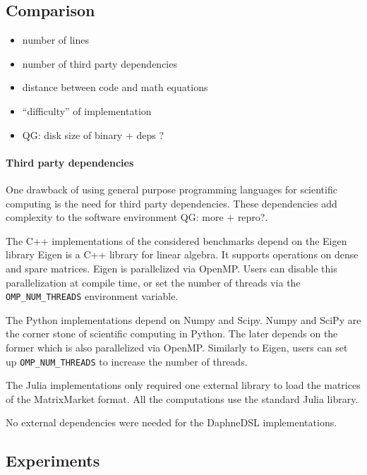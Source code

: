 \documentclass[conference,10pt,a4paper]{IEEEtran}
\newcommand{\qg}[1]{{\color{blue} QG: #1}} %
\begin{document}
\subsection{Comparison}

\begin{itemize}
\item number of lines
\item number of third party dependencies
\item distance between code and math equations
\item ``difficulty'' of implementation
\item \qg{disk size of binary + deps ?}
\end{itemize}

\paragraph{Third party dependencies}

One drawback of using general purpose programming languages for scientific computing is the need for third party dependencies.
These dependencies add complexity to the software environment \qg{more + repro?}.

The C++ implementations of the considered benchmarks depend on the Eigen library
Eigen \cite{guennebaud2010eigen} is a C++ library for linear algebra.
It supports operations on dense and spare matrices.
Eigen is parallelized via OpenMP.
Users can disable this parallelization at compile time, or set the number of threads via the \texttt{OMP\_NUM\_THREADS} environment variable.

The Python implementations depend on Numpy and Scipy.
Numpy \cite{harris2020array} and SciPy \cite{virtanen2020scipy} are the corner stone of scientific computing in Python.
The later depends on the former which is also parallelized via OpenMP.
Similarly to Eigen, users can set up \texttt{OMP\_NUM\_THREADS} to increase the number of threads.

The Julia implementations only required one external library to load the matrices of the MatrixMarket format.
All the computations use the standard Julia library. 

No external dependencies were needed for the DaphneDSL implementations.




\subsection{Experiments}
\end{document}
